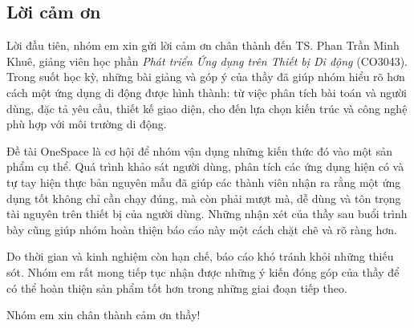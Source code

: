 \begin{center}
\section*{Lời cảm ơn}
\end{center}

Lời đầu tiên, nhóm em xin gửi lời cảm ơn chân thành đến TS. Phan Trần Minh Khuê, giảng viên học phần \textit{Phát triển Ứng dụng trên Thiết bị Di động} (CO3043). Trong suốt học kỳ, những bài giảng và góp ý của thầy đã giúp nhóm hiểu rõ hơn cách một ứng dụng di động được hình thành: từ việc phân tích bài toán và người dùng, đặc tả yêu cầu, thiết kế giao diện, cho đến lựa chọn kiến trúc và công nghệ phù hợp với môi trường di động.

Đề tài OneSpace là cơ hội để nhóm vận dụng những kiến thức đó vào một sản phẩm cụ thể. Quá trình khảo sát người dùng, phân tích các ứng dụng hiện có và tự tay hiện thực bản nguyên mẫu đã giúp các thành viên nhận ra rằng một ứng dụng tốt không chỉ cần chạy đúng, mà còn phải mượt mà, dễ dùng và tôn trọng tài nguyên trên thiết bị của người dùng. Những nhận xét của thầy sau buổi trình bày cũng giúp nhóm hoàn thiện báo cáo này một cách chặt chẽ và rõ ràng hơn.

Do thời gian và kinh nghiệm còn hạn chế, báo cáo khó tránh khỏi những thiếu sót. Nhóm em rất mong tiếp tục nhận được những ý kiến đóng góp của thầy để có thể hoàn thiện sản phẩm tốt hơn trong những giai đoạn tiếp theo.

Nhóm em xin chân thành cảm ơn thầy!
